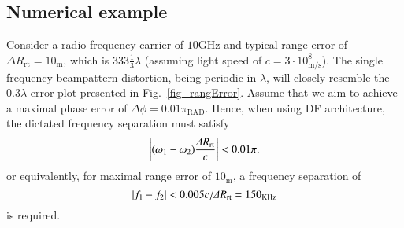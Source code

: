 \subsection*{Numerical example}
Consider a radio frequency carrier of $10\text{GHz}$ and typical range error of $\Delta{}R_{\text{rt}}=10_{\text{m}}$, which is $333\frac{1}{3}\lambda$ (assuming light speed of $c=3\cdot 10^{8}_{\text{m/s}}$). The single frequency beampattern distortion, being periodic in $\lambda$, will closely resemble the $0.3\lambda$ error plot presented in Fig.~\ref{fig_rangError}. Assume that we aim to achieve a maximal phase error of $\Delta \phi=0.01\pi_{\text{RAD}}$. Hence, when using DF architecture, the dictated frequency separation must satisfy
\begin{equation}\label{eq_DF_phErr}
\abs{(\omega_1-\omega_2)\frac{\Delta{}R_{\text{rt}}}{c}}<0.01\pi.
\end{equation}
or equivalently, for maximal range error of $10_\text{m}$, a frequency separation of
\[
\left\vert f_1-f_2\right\vert<0.005 c/\Delta{}R_{\text{rt}}=150_{\text{KHz}}
\]
is required. 

